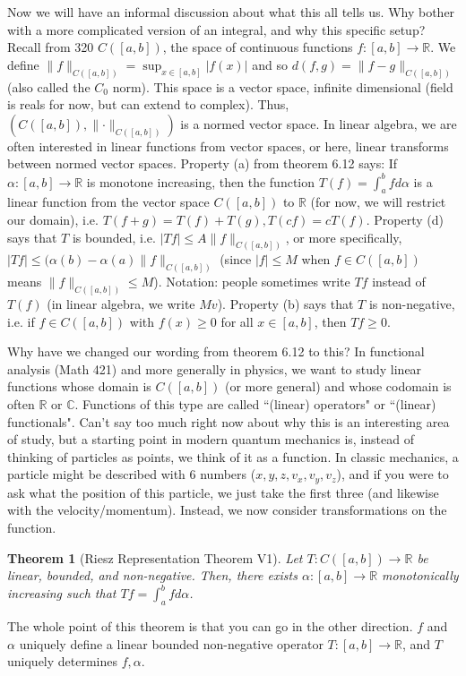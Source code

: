 \documentclass{article}
\theoremstyle{plain}
\newtheorem{theorem}{Theorem}
\theoremstyle{remark}
\newcommand{\R}{{\mathbb R}}
\newcommand{\C}{{\mathbb C}}
\begin{document}
Now we will have an informal discussion about what this all tells us.
Why bother with a more complicated version of an integral,
and why this specific setup?
Recall from 320 $C([a,b])$, the space of continuous functions $f \colon [a,b] \to \R$.
We define $\lVert f \rVert_{C([a,b])} = \sup_{x\in[a,b]}\lvert f(x)\rvert$
and so $d(f,g) = \lVert f - g \rVert_{C([a,b])}$
(also called the $C_0$ norm).
This space is a vector space, infinite dimensional
(field is reals for now, but can extend to complex).
Thus, $(C([a,b]), \lVert \cdot \rVert_{C([a,b])})$ is a normed vector space.
In linear algebra, we are often interested in linear functions from vector spaces,
or here, linear transforms between normed vector spaces.
Property (a) from theorem 6.12 says:
If $\alpha \colon [a,b] \to \R$ is monotone increasing,
then the function $T(f) = \int_a^b fd\alpha$ is a linear function
from the vector space $C([a,b])$ to $\R$ (for now, we will restrict our domain),
i.e. $T(f+g) = T(f) + T(g), T(cf) = cT(f)$.
Property (d) says that $T$ is bounded,
i.e. $|Tf| \leq A\lVert f \rVert_{C([a,b])}$,
or more specifically, $|Tf| \leq (\alpha(b) - \alpha(a)\lVert f \rVert_{C([a,b])}$
(since $|f| \leq M$ when $f \in C([a,b])$ means $\lVert f \rVert_{C([a,b])} \leq M$).
Notation: people sometimes write $Tf$ instead of $T(f)$
(in linear algebra, we write $Mv$).
Property (b) says that $T$ is non-negative, i.e.
if $f \in C([a,b])$ with $f(x) \geq 0$ for all $x \in [a,b]$, then $Tf \geq 0$.

Why have we changed our wording from theorem 6.12 to this?
In functional analysis (Math 421) and more generally in physics,
we want to study linear functions whose domain is $C([a,b])$ (or more general)
and whose codomain is often $\R$ or $\C$.
Functions of this type are called ``(linear) operators" or ``(linear) functionals".
Can't say too much right now about why this is an interesting area of study,
but a starting point in modern quantum mechanics is,
instead of thinking of particles as points, we think of it as a function.
In classic mechanics, a particle might be described with $6$ numbers
($x,y,z,v_x,v_y,v_z$),
and if you were to ask what the position of this particle, we just take the first three
(and likewise with the velocity/momentum).
Instead, we now consider transformations on the function.

\begin{theorem}[Riesz Representation Theorem V1]
	Let $T \colon C([a,b]) \to \R$ be linear, bounded, and non-negative.
	Then, there exists $\alpha \colon [a,b] \to \R$ monotonically increasing
	such that $Tf = \int_a^b fd\alpha$.
\end{theorem}
The whole point of this theorem is that you can go in the other direction.
$f$ and $\alpha$ uniquely define a linear bounded non-negative operator $T \colon [a,b] \to \R$,
and $T$ uniquely determines $f,\alpha$.
\end{document}
